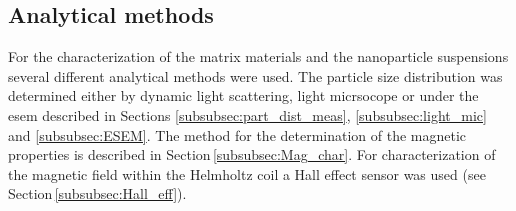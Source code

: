  

\subsection{Analytical methods}
\label{subsec:ana_met}
 For the characterization of the matrix materials and the nanoparticle suspensions several different analytical methods were used. The particle size distribution was determined either by dynamic light scattering, light micrsocope or under the \gls{esem} described in Sections \ref{subsubsec:part_dist_meas}, \ref{subsubsec:light_mic} and \ref{subsubsec:ESEM}. The method for the determination of the magnetic properties is described in Section\,\ref{subsubsec:Mag_char}. For characterization of the magnetic field within the Helmholtz coil a Hall effect sensor was used (see Section\,\ref{subsubsec:Hall_eff}).   
 
 
